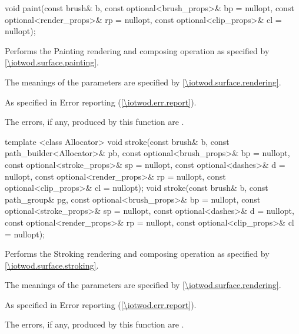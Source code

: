 \begin{itemdecl}
void paint(const brush& b, const optional<brush_props>& bp = nullopt,
  const optional<render_props>& rp = nullopt,
  const optional<clip_props>& cl = nullopt);
\end{itemdecl}
\begin{itemdescr}
\pnum
\effects
Performs the Painting rendering and composing operation as specified by \ref{\iotwod.surface.painting}.

\pnum
The meanings of the parameters are specified by \ref{\iotwod.surface.rendering}.

\pnum
\throws
As specified in Error reporting (\ref{\iotwod.err.report}).

\pnum
\errors
The errors, if any, produced by this function are .
\end{itemdescr}

\begin{itemdecl}
template <class Allocator>
void stroke(const brush& b, const path_builder<Allocator>& pb,
  const optional<brush_props>& bp = nullopt,
  const optional<stroke_props>& sp = nullopt,
  const optional<dashes>& d = nullopt,
  const optional<render_props>& rp = nullopt,
  const optional<clip_props>& cl = nullopt);
void stroke(const brush& b, const path_group& pg,
  const optional<brush_props>& bp = nullopt,
  const optional<stroke_props>& sp = nullopt,
  const optional<dashes>& d = nullopt,
  const optional<render_props>& rp = nullopt,
  const optional<clip_props>& cl = nullopt);
\end{itemdecl}
\begin{itemdescr}
\pnum
\effects
Performs the Stroking rendering and composing operation as specified by \ref{\iotwod.surface.stroking}.

\pnum
The meanings of the parameters are specified by \ref{\iotwod.surface.rendering}.

\pnum
\throws
As specified in Error reporting (\ref{\iotwod.err.report}).

\pnum
\errors
The errors, if any, produced by this function are .
\end{itemdescr}

